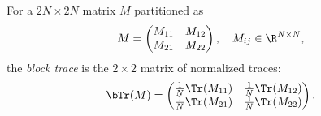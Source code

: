 \begin{definition}\label{def:block-trace}
For a $2N \times 2N$ matrix $M$ partitioned as
\[
M = \begin{pmatrix} M_{11} & M_{12} \\ M_{21} & M_{22} \end{pmatrix},
\quad M_{ij} \in \R^{N \times N},
\]
the \emph{block trace} is the $2 \times 2$ matrix of normalized traces:
\[
\bTr(M) = \begin{pmatrix} \frac{1}{N}\Tr(M_{11}) & \frac{1}{N}\Tr(M_{12}) \\ \frac{1}{N}\Tr(M_{21}) & \frac{1}{N}\Tr(M_{22}) \end{pmatrix}.
\]
\end{definition}
